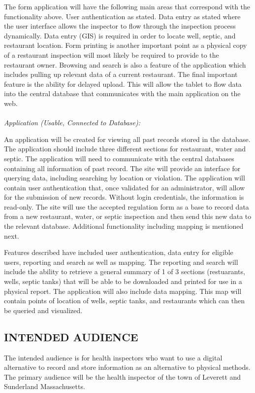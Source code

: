 \documentclass[twoside,letterpaper]{article}
\begin{document}
{The form application will have the following main areas that correspond with the functionality above. User authentication as stated. Data entry as stated where the user interface allows the inspector to flow through the inspection process dynamically. Data entry (GIS) is required in order to locate well, septic, and restaurant location. Form printing is another important point as a physical copy of a restaurant inspection will most likely be required to provide to the restaurant owner. Browsing and search is also a feature of the application which includes pulling up relevant data of a current restaurant. The final important feature is the ability for delayed upload. This will allow the tablet to flow data into the central database that communicates with the main application on the web.
\\ \\
\textit{Application (Usable, Connected to Database):}
\newline

An application will be created for viewing all past records stored in the database. The application should include three different sections for restaurant, water and septic.  The application will need to communicate with the central databases containing all information of past record. The site will provide an interface for querying data, including searching by location or violation. The application will contain user authentication that, once validated for an administrator, will allow for the submission of new records. Without login credentials, the information is read-only. The site will use the accepted regulation form as a base to record data from a new restaurant, water, or septic inspection and then send this new data to the relevant database. Additional functionality including mapping is mentioned next.
\newline 

Features described have included user authentication, data entry for eligible users, reporting and search as well as mapping. The reporting and search will include the ability to retrieve a general summary of 1 of 3 sections (restuarants, wells, septic tanks) that will be able to be downloaded and printed for use in a physical report. The application will also include data mapping. This map will contain points of location of wells, septic tanks, and restaurants which can then be queried and visualized. }

\subsection[INTENDED AUDIENCE]{\rmfamily\bfseries\color{black}
INTENDED AUDIENCE}
{\rmfamily\color{black}
    The intended audience is for health inspectors who want to use a digital alternative to record and store information as an alternative to physical methods. The primary audience will be the health inspector of the town of Leverett and Sunderland Massachusetts.}
\end{document}

